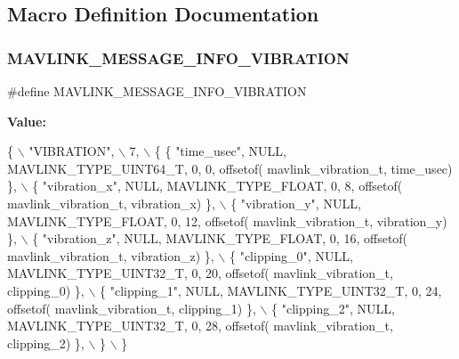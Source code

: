 \subsection{Macro Definition Documentation}
\mbox{\label{mavlink__msg__vibration_8h_a8b4bf270e75bb6d220e34586f9dda8b3}} 
\subsubsection{M\+A\+V\+L\+I\+N\+K\+\_\+\+M\+E\+S\+S\+A\+G\+E\+\_\+\+I\+N\+F\+O\+\_\+\+V\+I\+B\+R\+A\+T\+I\+ON}
{\footnotesize\ttfamily \#define M\+A\+V\+L\+I\+N\+K\+\_\+\+M\+E\+S\+S\+A\+G\+E\+\_\+\+I\+N\+F\+O\+\_\+\+V\+I\+B\+R\+A\+T\+I\+ON}

{\bfseries Value\+:}
\begin{DoxyCode}
\{ \(\backslash\)
    \textcolor{stringliteral}{"VIBRATION"}, \(\backslash\)
    7, \(\backslash\)
    \{  \{ \textcolor{stringliteral}{"time\_usec"}, NULL, MAVLINK_TYPE_UINT64_T, 0, 0, offsetof(
      mavlink_vibration_t, time\_usec) \}, \(\backslash\)
         \{ \textcolor{stringliteral}{"vibration\_x"}, NULL, MAVLINK_TYPE_FLOAT, 0, 8, offsetof(
      mavlink_vibration_t, vibration\_x) \}, \(\backslash\)
         \{ \textcolor{stringliteral}{"vibration\_y"}, NULL, MAVLINK_TYPE_FLOAT, 0, 12, offsetof(
      mavlink_vibration_t, vibration\_y) \}, \(\backslash\)
         \{ \textcolor{stringliteral}{"vibration\_z"}, NULL, MAVLINK_TYPE_FLOAT, 0, 16, offsetof(
      mavlink_vibration_t, vibration\_z) \}, \(\backslash\)
         \{ \textcolor{stringliteral}{"clipping\_0"}, NULL, MAVLINK_TYPE_UINT32_T, 0, 20, offsetof(
      mavlink_vibration_t, clipping\_0) \}, \(\backslash\)
         \{ \textcolor{stringliteral}{"clipping\_1"}, NULL, MAVLINK_TYPE_UINT32_T, 0, 24, offsetof(
      mavlink_vibration_t, clipping\_1) \}, \(\backslash\)
         \{ \textcolor{stringliteral}{"clipping\_2"}, NULL, MAVLINK_TYPE_UINT32_T, 0, 28, offsetof(
      mavlink_vibration_t, clipping\_2) \}, \(\backslash\)
         \} \(\backslash\)
\}
\end{DoxyCode}
\mbox{\label{mavlink__msg__vibration_8h_af3b77bdf610eddc3e76b817a1339f781}} 
